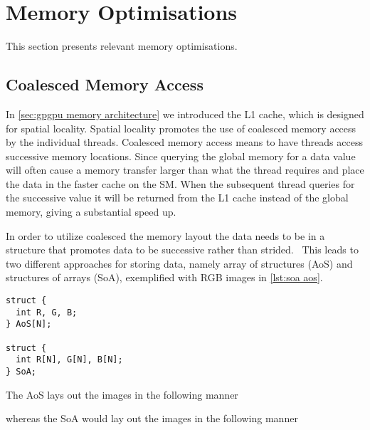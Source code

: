 \section{Memory Optimisations}
\label{sec:memory optimisations}

This section presents relevant memory optimisations.

\subsection{Coalesced Memory Access}
\label{sec:coalesced}

In \cref{sec:gpgpu memory architecture} we introduced the L1 cache, which is designed for spatial locality.
Spatial locality promotes the use of coalesced memory access by the individual threads.
Coalesced memory access means to have threads access successive memory locations.
Since querying the global memory for a data value will often cause a memory transfer larger than what the thread requires and place the data in the faster cache on the SM.
When the subsequent thread queries for the successive value it will be returned from the L1 cache instead of the global memory, giving a substantial speed up.

In order to utilize coalesced the memory layout the data needs to be in a structure that promotes data to be successive rather than strided.~\cite{udacity}
This leads to two different approaches for storing data, namely array of structures (AoS) and structures of arrays (SoA), exemplified with RGB images in \cref{lst:soa aos}.

\begin{lstlisting}[caption={Example of SoA and AoS with RGB images}, label={lst:soa aos}]
struct {
  int R, G, B;
} AoS[N];

struct {
  int R[N], G[N], B[N];
} SoA;
\end{lstlisting}

The AoS lays out the images in the following manner

\begin{quote} 
\end{quote}

whereas the SoA would lay out the images in the following manner

\begin{quote}
\end{quote}

